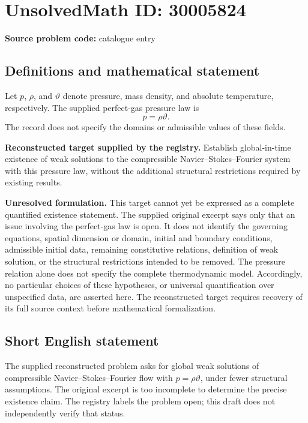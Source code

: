 \documentclass[11pt]{article}
\begin{document}
\section*{UnsolvedMath ID: 30005824}
\textbf{Source problem code:} catalogue entry
\subsection{Definitions and mathematical statement}
Let \(p\), \(\rho\), and \(\vartheta\) denote pressure, mass density, and absolute temperature, respectively. The supplied perfect-gas pressure law is
\[
p=\rho\vartheta.
\]
The record does not specify the domains or admissible values of these fields.

\textbf{Reconstructed target supplied by the registry.} Establish global-in-time existence of weak solutions to the compressible Navier--Stokes--Fourier system with this pressure law, without the additional structural restrictions required by existing results.

\textbf{Unresolved formulation.} This target cannot yet be expressed as a complete quantified existence statement. The supplied original excerpt says only that an issue involving the perfect-gas law is open. It does not identify the governing equations, spatial dimension or domain, initial and boundary conditions, admissible initial data, remaining constitutive relations, definition of weak solution, or the structural restrictions intended to be removed. The pressure relation alone does not specify the complete thermodynamic model. Accordingly, no particular choices of these hypotheses, or universal quantification over unspecified data, are asserted here. The reconstructed target requires recovery of its full source context before mathematical formalization.
\subsection{Short English statement}
The supplied reconstructed problem asks for global weak solutions of compressible Navier--Stokes--Fourier flow with \(p=\rho\vartheta\), under fewer structural assumptions. The original excerpt is too incomplete to determine the precise existence claim. The registry labels the problem open; this draft does not independently verify that status.
\end{document}
